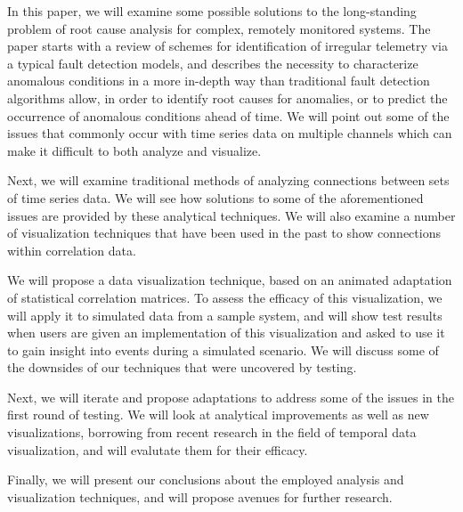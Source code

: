 In this paper, we will examine some possible solutions to the long-standing problem of root cause analysis for complex, remotely monitored systems. The paper starts with a review of schemes for identification of irregular telemetry via a typical fault detection models, and describes the necessity to characterize anomalous conditions in a more in-depth way than traditional fault detection algorithms allow, in order to identify root causes for anomalies, or to predict the occurrence of anomalous conditions ahead of time. We will point out some of the issues that commonly occur with time series data on multiple channels which can make it difficult to both analyze and visualize.

Next, we will examine traditional methods of analyzing connections between sets of time series data. We will see how solutions to some of the aforementioned issues are provided by these analytical techniques. We will also examine a number of visualization techniques that have been used in the past to show connections within correlation data.

We will propose a data visualization technique, based on an animated adaptation of statistical correlation matrices. To assess the efficacy of this visualization, we will apply it to simulated data from a sample system, and will show test results when users are given an implementation of this visualization and asked to use it to gain insight into events during a simulated scenario. We will discuss some of the downsides of our techniques that were uncovered by testing.

Next, we will iterate and propose adaptations to address some of the issues in the first round of testing. We will look at analytical improvements as well as new visualizations, borrowing from recent research in the field of temporal data visualization, and will evalutate them for their efficacy.

Finally, we will present our conclusions about the employed analysis and visualization techniques, and will propose avenues for further research.